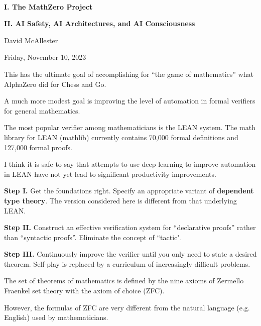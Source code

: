 


\newcommand{\bij}{\mathbf{Bij}}
\newcommand{\true}{\mathbf{ True}} \newcommand{\false}{\mathbf{False}}



{\Huge
  ~ \vfill
  \centerline{\bf I. The MathZero Project}
  \bigskip
 \bigskip
  \centerline{\bf II. AI Safety, AI Architectures, and AI Consciousness}
  \bigskip
  \bigskip
  \bigskip
  \bigskip
  \centerline{David McAllester}
  \medskip
  \centerline{Friday, November 10, 2023}

\vfill


This has the ultimate goal of accomplishing for ``the game of mathematics'' what AlphaZero did for Chess and Go.

\vfill
A much more modest goal is improving the level of automation in formal verifiers for general mathematics.

\vfill
The most popular verifier among mathematicians is the LEAN system. The math library for LEAN (mathlib) currently contains 70,000 formal definitions and 127,000 formal proofs.

\vfill
I think it is safe to say that attempts to use deep learning to improve automation in LEAN have not yet
lead to significant productivity improvements.


\vfill
{\bf Step I.} Get the foundations right. Specify an appropriate variant of {\bf dependent type theory}.  
The version considered here is different from that underlying LEAN.

\vfill
{\bf Step II.} Construct an effective verification system for ``declarative proofs'' rather than ``syntactic proofs''. Eliminate the concept of ``tactic".

\vfill
{\bf Step III.} Continuously improve the verifier until you only need to state a desired theorem.  Self-play is replaced by a curriculum of increasingly difficult problems.



The set of theorems of mathematics is defined by
the nine axioms of Zermello Fraenkel set theory with the axiom of choice (ZFC).

\vfill
However, the formulas of ZFC are very different from the natural language (e.g. English) used by mathematicians.

}
